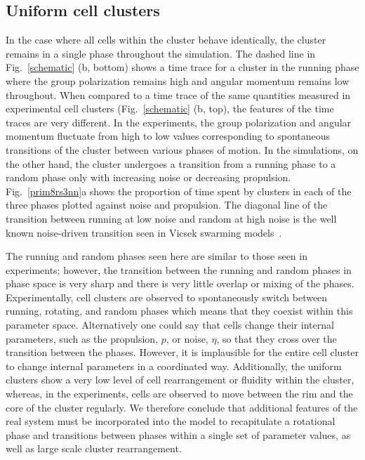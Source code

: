 \documentclass{article}
\begin{document}
\subsection*{Uniform cell clusters}
In the case where all cells within the cluster behave identically, the cluster remains in a single phase throughout the simulation. The dashed line in Fig.~\ref{schematic} (b, bottom) shows a time trace for a cluster in the running phase where the group polarization remains high and angular momentum remains low throughout. When compared to a time trace of the same quantities measured in experimental cell clusters (Fig.~\ref{schematic} (b, top), the features of the time traces are very different.  In the experiments, the group polarization and angular momentum fluctuate from high to low values corresponding to spontaneous transitions of the cluster between various phases of motion.  In the simulations, on the other hand, the cluster undergoes a transition from a running phase to a random phase only with increasing noise or decreasing propulsion.  Fig.~\ref{prim8rs3nn}a shows the proportion of time spent by clusters in each of the three phases plotted against noise and propulsion. The diagonal line of the transition between running at low noise and random at high noise is the well known noise-driven transition seen in Vicsek swarming models~\cite{Guillaume2004,Vicsek1995,Peruani2008}.

The running and random phases seen here are similar to those seen in experiments; however, the transition between the running and random phases in phase space is very sharp and there is very little overlap or mixing of the phases.  Experimentally, cell clusters are observed to spontaneously switch between running, rotating, and random phases which means that they coexist within this parameter space.  Alternatively one could say that cells change their internal parameters, such as the propulsion, $p$, or noise, $\eta$, so that they cross over the transition between the phases.  However, it is implausible for the entire cell cluster to change internal parameters in a coordinated way. Additionally, the uniform clusters show a very low level of cell rearrangement or fluidity within the cluster, whereas, in the experiments, cells are observed to move between the rim and the core of the cluster regularly. We therefore conclude that additional features of the real system must be incorporated into the model to recapitulate a rotational
phase and transitions between phases within a single set of parameter values, as well as large scale cluster rearrangement.
\end{document}
